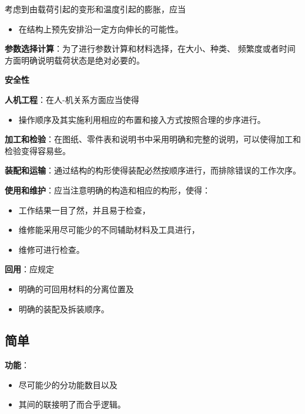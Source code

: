 \documentclass[letterpaper,10pt,english]{sphinxmanual}
\begin{document}
考虑到由载荷引起的变形和温度引起的膨胀，应当
\begin{itemize}
\item {} 
在结构上预先安排沿一定方向伸长的可能性。

\end{itemize}

\textbf{参数选择计算}：为了进行参数计算和材料选择，在大小、种类、
频繁度或者时间方面明确说明载荷状态是绝对必要的。

\textbf{安全性}

\textbf{人机工程}：在人-机关系方面应当使得
\begin{itemize}
\item {} 
操作顺序及其实施利用相应的布置和接入方式按照合理的步序进行。

\end{itemize}

\textbf{加工和检验}：在图纸、零件表和说明书中采用明确和完整的说明，可以使得加工和检验变得容易些。

\textbf{装配和运输}：通过结构的构形使得装配必然按顺序进行，而排除错误的工作次序。

\textbf{使用和维护}：应当注意明确的构造和相应的构形，使得：
\begin{itemize}
\item {} 
工作结果一目了然，并且易于检查，

\item {} 
维修能采用尽可能少的不同辅助材料及工具进行，

\item {} 
维修可进行检查。

\end{itemize}

\textbf{回用}：应规定
\begin{itemize}
\item {} 
明确的可回用材料的分离位置及

\item {} 
明确的装配及拆装顺序。

\end{itemize}


\subsection{简单}
\label{unit6:id6}
\textbf{功能}：
\begin{itemize}
\item {} 
尽可能少的分功能数目以及

\item {} 
其间的联接明了而合乎逻辑。

\end{itemize}
\end{document}
